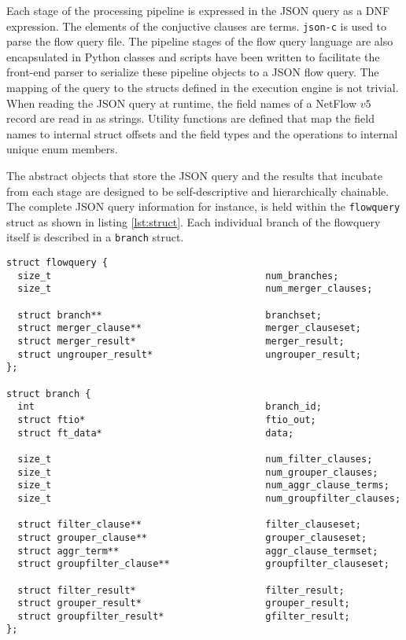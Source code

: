 Each stage of the processing pipeline is expressed in the JSON query as a
\ac{DNF} expression. The elements of the conjuctive clauses are terms.
\texttt{json-c} \cite{jsonc} is used to parse the flow query file. The
pipeline stages of the flow query language are also encapsulated in Python
classes and scripts have been written to facilitate the front-end parser to
serialize these pipeline objects to a JSON flow query.  The mapping
of the query to the structs defined in the execution engine is not trivial.
When reading the JSON query at runtime, the field names of a NetFlow
$v5$ record are read in as strings.  Utility functions are defined that map
the field names to internal struct offsets and the field types and the
operations to internal unique enum members.

The abstract objects that store the JSON query and the results that incubate
from each stage are designed to be self-descriptive and hierarchically
chainable.  The complete JSON query information for instance, is held within
the \texttt{flowquery} struct as shown in listing \ref{lst:struct}. Each
individual branch of the flowquery itself is described in a \texttt{branch}
struct.

\begin{lstlisting}
struct flowquery {
  size_t                                      num_branches;
  size_t                                      num_merger_clauses;

  struct branch**                             branchset;
  struct merger_clause**                      merger_clauseset;
  struct merger_result*                       merger_result;
  struct ungrouper_result*                    ungrouper_result;
};

struct branch {
  int                                         branch_id;
  struct ftio*                                ftio_out;
  struct ft_data*                             data;

  size_t                                      num_filter_clauses;
  size_t                                      num_grouper_clauses;
  size_t                                      num_aggr_clause_terms;
  size_t                                      num_groupfilter_clauses;

  struct filter_clause**                      filter_clauseset;
  struct grouper_clause**                     grouper_clauseset;
  struct aggr_term**                          aggr_clause_termset;
  struct groupfilter_clause**                 groupfilter_clauseset;

  struct filter_result*                       filter_result;
  struct grouper_result*                      grouper_result;
  struct groupfilter_result*                  gfilter_result;
};
\end{lstlisting}

